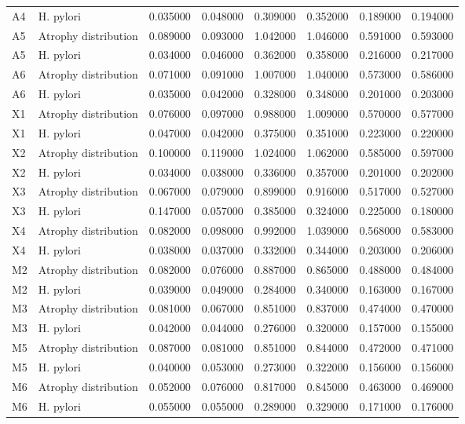 \begin{table}
\begin{tabular}{llrrrrrr}
A4 & H. pylori & 0.035000 & 0.048000 & 0.309000 & 0.352000 & 0.189000 & 0.194000 \\
A5 & Atrophy distribution & 0.089000 & 0.093000 & 1.042000 & 1.046000 & 0.591000 & 0.593000 \\
A5 & H. pylori & 0.034000 & 0.046000 & 0.362000 & 0.358000 & 0.216000 & 0.217000 \\
A6 & Atrophy distribution & 0.071000 & 0.091000 & 1.007000 & 1.040000 & 0.573000 & 0.586000 \\
A6 & H. pylori & 0.035000 & 0.042000 & 0.328000 & 0.348000 & 0.201000 & 0.203000 \\
X1 & Atrophy distribution & 0.076000 & 0.097000 & 0.988000 & 1.009000 & 0.570000 & 0.577000 \\
X1 & H. pylori & 0.047000 & 0.042000 & 0.375000 & 0.351000 & 0.223000 & 0.220000 \\
X2 & Atrophy distribution & 0.100000 & 0.119000 & 1.024000 & 1.062000 & 0.585000 & 0.597000 \\
X2 & H. pylori & 0.034000 & 0.038000 & 0.336000 & 0.357000 & 0.201000 & 0.202000 \\
X3 & Atrophy distribution & 0.067000 & 0.079000 & 0.899000 & 0.916000 & 0.517000 & 0.527000 \\
X3 & H. pylori & 0.147000 & 0.057000 & 0.385000 & 0.324000 & 0.225000 & 0.180000 \\
X4 & Atrophy distribution & 0.082000 & 0.098000 & 0.992000 & 1.039000 & 0.568000 & 0.583000 \\
X4 & H. pylori & 0.038000 & 0.037000 & 0.332000 & 0.344000 & 0.203000 & 0.206000 \\
M2 & Atrophy distribution & 0.082000 & 0.076000 & 0.887000 & 0.865000 & 0.488000 & 0.484000 \\
M2 & H. pylori & 0.039000 & 0.049000 & 0.284000 & 0.340000 & 0.163000 & 0.167000 \\
M3 & Atrophy distribution & 0.081000 & 0.067000 & 0.851000 & 0.837000 & 0.474000 & 0.470000 \\
M3 & H. pylori & 0.042000 & 0.044000 & 0.276000 & 0.320000 & 0.157000 & 0.155000 \\
M5 & Atrophy distribution & 0.087000 & 0.081000 & 0.851000 & 0.844000 & 0.472000 & 0.471000 \\
M5 & H. pylori & 0.040000 & 0.053000 & 0.273000 & 0.322000 & 0.156000 & 0.156000 \\
M6 & Atrophy distribution & 0.052000 & 0.076000 & 0.817000 & 0.845000 & 0.463000 & 0.469000 \\
M6 & H. pylori & 0.055000 & 0.055000 & 0.289000 & 0.329000 & 0.171000 & 0.176000 \\

\end{tabular}
\end{table}
